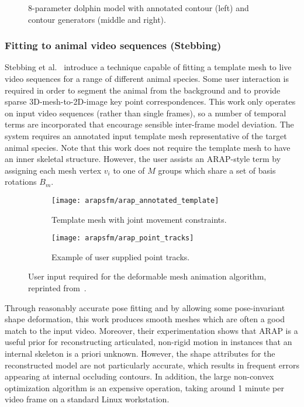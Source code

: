     \begin{figure}[H] %
        \caption{8-parameter dolphin model with annotated contour (left) and contour generators (middle and right).}
        \label{fig:cashman_fitzgibbon}
    \end{figure}


    \subsubsection{Fitting to animal video sequences (Stebbing)}

    Stebbing et al.~\cite{arap_stebbing} introduce a technique capable of fitting a template mesh to live video sequences for a range of different animal species. Some user interaction is required in order to segment the animal from the background and to provide sparse 3D-mesh-to-2D-image key point correspondences. This work only operates on input video sequences (rather than single frames), so a number of temporal terms are incorporated that encourage sensible inter-frame model deviation. The system requires an annotated input template mesh representative of the target animal species. Note that this work does not require the template mesh to have an inner skeletal structure. However, the user assists an ARAP-style term by assigning each mesh vertex $v_i$ to one of $M$ groups which share a set of basis rotations $B_{m}$. 

    \begin{figure}[H]
        \centering
        \begin{subfigure}{0.5\textwidth}
        \centering
            \texttt{[image: arapsfm/arap\_annotated\_template]}
            \caption{Template mesh with joint movement constraints.}
        \end{subfigure}%
        \begin{subfigure}{0.5\textwidth}
        \centering
            \texttt{[image: arapsfm/arap\_point\_tracks]}
            \caption{Example of user supplied point tracks.}
        \end{subfigure}%
        \caption{User input required for the deformable mesh animation algorithm, reprinted from~\cite{arap_stebbing}.}
        \label{fig:arap_user}
    \end{figure} 

    Through reasonably accurate pose fitting and by allowing some pose-invariant shape deformation, this work produces smooth meshes which are often a good match to the input video. Moreover, their experimentation shows that ARAP is a useful prior for reconstructing articulated, non-rigid motion in instances that an internal skeleton is a priori unknown. However, the shape attributes for the reconstructed model are not particularly accurate, which results in frequent errors appearing at internal occluding contours. In addition, the large non-convex optimization algorithm is an expensive operation, taking around 1 minute per video frame on a standard Linux workstation.

